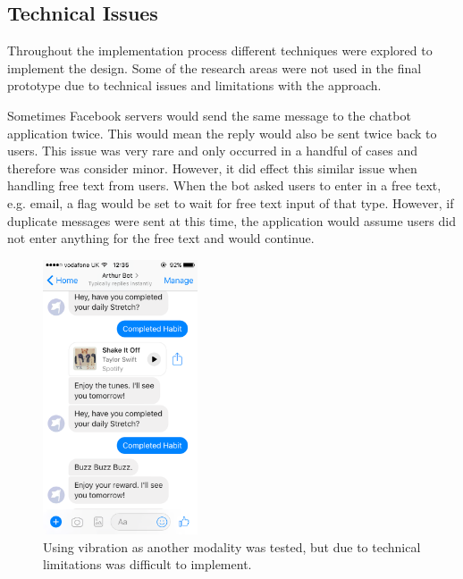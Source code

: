 \subsection*{Technical Issues}
Throughout the implementation process different techniques were explored to implement the design.
Some of the research areas were not used in the final prototype due to technical issues and limitations with the approach.


Sometimes Facebook servers would send the same message to the chatbot application twice. This would mean the reply would also be sent twice back to users. This issue was very rare and only occurred in a handful of cases and therefore was consider minor. However, it did effect this similar issue when handling free text from users. When the bot asked users to enter in a free text, e.g. email, a flag would be set to wait for free text input of that type. However, if duplicate messages were sent at this time, the application would assume users did not enter anything for the free text and would continue.

\begin{figure}[H]
    \centering
    \includegraphics[width=1.8in]{../resources/design/vibration-reward.png}
    \caption{Using vibration as another modality was tested, but due to technical limitations was difficult to implement.}
    \label{fig:vibration_reward_issue}
\end{figure}

